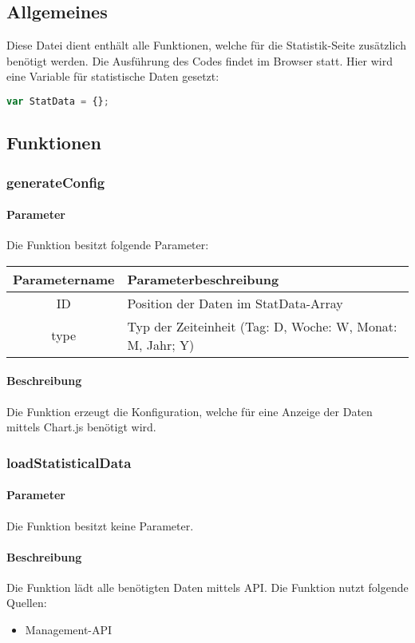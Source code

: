 \subsection{Allgemeines} Diese Datei dient enthält alle Funktionen, welche für die Statistik-Seite zusätzlich benötigt werden.
Die Ausführung des Codes findet im Browser statt. Hier wird eine Variable für statistische Daten gesetzt:
\begin{lstlisting}[language=JavaScript]
var StatData = {};
\end{lstlisting} 
\subsection{Funktionen}
\subsubsection{generateConfig}
\paragraph{Parameter} Die Funktion besitzt folgende Parameter:
\begin{table}[H]
	\begin{tabular}{|c|p{11cm}|}
		\hline
		\textbf{Parametername} & \textbf{Parameterbeschreibung} \\ \hline
		ID   & Position der Daten im {\glqq StatData\grqq}-Array \\ \hline
		type & Typ der Zeiteinheit (Tag: D, Woche: W, Monat: M, Jahr; Y) \\ \hline
	\end{tabular}
\end{table}
\paragraph{Beschreibung} Die Funktion erzeugt die Konfiguration, welche für eine Anzeige der Daten mittels {\glqq Chart.js\grqq} benötigt wird.
\subsubsection{loadStatisticalData}
\paragraph{Parameter} Die Funktion besitzt keine Parameter.
\paragraph{Beschreibung} Die Funktion lädt alle benötigten Daten mittels API. Die Funktion nutzt folgende Quellen:
\begin{itemize}
	\item Management-API
\end{itemize}
